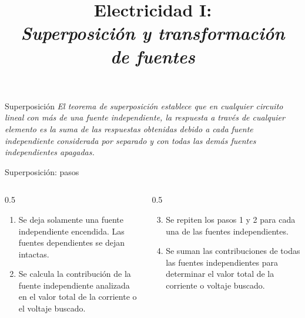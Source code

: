 \documentclass[aspectratio=169]{beamer}
\title{
    Electricidad I:\\
    \alert{\emph{Superposición y transformación}}\\
    \alert{\emph{de fuentes}}
}
\begin{document}


\begin{frame}{Superposición}
    \emph{El teorema de superposición establece que en cualquier circuito lineal con más de una fuente independiente, la respuesta a través de cualquier elemento es la suma de las respuestas obtenidas debido a cada fuente independiente considerada por separado y con todas las demás fuentes independientes apagadas.}
\end{frame}

\begin{frame}{Superposición: pasos}
    \begin{columns}[onlytextwidth,T]
    \begin{column}{0.5\textwidth}
        \begin{enumerate}
            \item<+-> Se deja solamente una fuente independiente encendida. Las fuentes dependientes se dejan intactas.
            \item<+-> Se calcula la contribución de la fuente independiente analizada en el valor total de la corriente o el voltaje buscado.
        \end{enumerate}
    \end{column}
    \begin{column}{0.5\textwidth}
        \begin{enumerate}
        \setcounter{enumi}{2}
            \item<+-> Se repiten los pasos 1 y 2 para cada una de las fuentes independientes.
            \item<+-> Se suman las contribuciones de todas las fuentes independientes para determinar el valor total de la corriente o voltaje buscado. 
        \end{enumerate}
    \end{column}
    \end{columns}
\end{frame}
\end{document}
